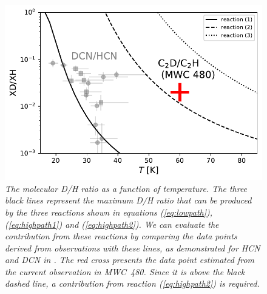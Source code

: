 \documentclass[12pt,a4paper]{article}  %
\begin{document}
\begin{figure}[tbh]
\begin{minipage}[b]{0.6\hsize}
\centering
\includegraphics[scale=0.75]{XD2XH_vs_T}
\caption{\em{The molecular D/H ratio as a function of temperature. The three black lines represent the maximum D/H ratio that can be produced by the three reactions shown in equations (\ref{eq:lowpath}), (\ref{eq:highpath1}) and (\ref{eq:highpath2}). We can evaluate the contribution from these reactions by comparing the data points derived from observations with these lines, as demonstrated for HCN and DCN in \citet{Cataldi21}. The red cross presents the data point estimated from the current observation in MWC~480. Since it is above the black dashed line, a contribution from reaction (\ref{eq:highpath2}) is required. %
}
}
\label{fig:DCN_path}
\end{minipage}
\end{figure}
\end{document}
